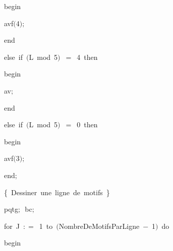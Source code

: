 {\vspace{\neglskip}\mbox{\blc  \blk\blk\blk\blk\blk\idt  \mcl begin\idt }\par 
\vspace{\neglskip}\mbox{\blc  \blk\blk\blk\blk\blk\blk\idt  avf$($4$)$$;$}\par 
\vspace{\neglskip}\mbox{\blc  \blk\blk\blk\blk\blk\idt  \mcl end\idt }\par 
\pagebreak[3] 
\vspace{\neglskip}\mbox{\blc  \blk\blk\blk\blk\idt  \mcl else\idt \ \mcl if\idt \ $($L\ \mcl mod\idt \ 5$)$\ $=$\ 4\ \mcl then\idt }\par 
\vspace{\neglskip}\mbox{\blc  \blk\blk\blk\blk\blk\idt  \mcl begin\idt }\par 
\vspace{\neglskip}\mbox{\blc  \blk\blk\blk\blk\blk\blk\idt  av$;$}\par 
\vspace{\neglskip}\mbox{\blc  \blk\blk\blk\blk\blk\idt  \mcl end\idt }\par 
\pagebreak[3] 
\vspace{\neglskip}\mbox{\blc  \blk\blk\blk\blk\idt  \mcl else\idt \ \mcl if\idt \ $($L\ \mcl mod\idt \ 5$)$\ $=$\ 0\ \mcl then\idt }\par 
\vspace{\neglskip}\mbox{\blc  \blk\blk\blk\blk\blk\idt  \mcl begin\idt }\par 
\vspace{\neglskip}\mbox{\blc  \blk\blk\blk\blk\blk\blk\idt  avf$($3$)$$;$}\par 
\vspace{\neglskip}\mbox{\blc  \blk\blk\blk\blk\blk\idt  \mcl end\idt $;$}\par 
\vspace{\neglskip}\mbox{\blc  \blk\blk\blk\blk\idt  \cmt  \{\ Dessiner\ une\ ligne\ de\ motifs\ \}\idt }\par 
\vspace{\neglskip}\mbox{\blc  \blk\blk\blk\blk\idt  pqtg$;$\ bc$;$}\par 
\pagebreak[3] 
\vspace{\neglskip}\mbox{\blc  \blk\blk\blk\blk\idt  \mcl for\idt \ J\ $:$$=$\ 1\ \mcl to\idt \ $($NombreDeMotifsParLigne\ $-$\ 1$)$\ \mcl do\idt \ }\par 
\vspace{\neglskip}\mbox{\blc  \blk\blk\blk\blk\blk\idt  \mcl begin\idt }\par 
}

